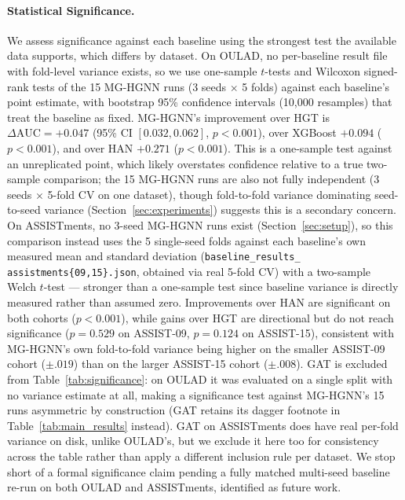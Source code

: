 \documentclass[sigconf,review]{acmart}
\begin{document}
\paragraph{Statistical Significance.}
We assess significance against each baseline using the
strongest test the available data supports, which differs
by dataset. On OULAD, no per-baseline result file with
fold-level variance exists, so we use one-sample $t$-tests
and Wilcoxon signed-rank tests of the 15 MG-HGNN runs
(3 seeds $\times$ 5 folds) against each baseline's point
estimate, with bootstrap 95\% confidence intervals (10,000
resamples) that treat the baseline as fixed. MG-HGNN's
improvement over HGT is $\Delta\text{AUC}=+0.047$ (95\% CI
$[0.032, 0.062]$, $p<0.001$), over XGBoost $+0.094$
($p<0.001$), and over HAN $+0.271$ ($p<0.001$). This is a
one-sample test against an unreplicated point, which likely
overstates confidence relative to a true two-sample
comparison; the 15 MG-HGNN runs are also not fully
independent (3 seeds $\times$ 5-fold CV on one dataset),
though fold-to-fold variance dominating seed-to-seed
variance (Section~\ref{sec:experiments}) suggests this is a
secondary concern.
On ASSISTments, no 3-seed MG-HGNN runs exist
(Section~\ref{sec:setup}), so this comparison instead uses
the 5 single-seed folds against each baseline's own measured
mean and standard deviation (\texttt{baseline\_results\_
assistments\{09,15\}.json}, obtained via real 5-fold CV) with
a two-sample Welch $t$-test --- stronger than a one-sample
test since baseline variance is directly measured rather
than assumed zero. Improvements over HAN are significant on
both cohorts ($p<0.001$), while gains over HGT are
directional but do not reach significance ($p=0.529$ on
ASSIST-09, $p=0.124$ on ASSIST-15), consistent with
MG-HGNN's own fold-to-fold variance being higher on the
smaller ASSIST-09 cohort ($\pm.019$) than on the larger
ASSIST-15 cohort ($\pm.008$).
GAT is excluded from Table~\ref{tab:significance}: on OULAD
it was evaluated on a single split with no variance estimate
at all, making a significance test against MG-HGNN's 15 runs
asymmetric by construction (GAT retains its dagger footnote
in Table~\ref{tab:main_results} instead). GAT on ASSISTments
does have real per-fold variance on disk, unlike OULAD's, but
we exclude it here too for consistency across the table
rather than apply a different inclusion rule per dataset. We
stop short of a formal significance claim pending a fully
matched multi-seed baseline re-run on both OULAD and
ASSISTments, identified as future work.
\end{document}
